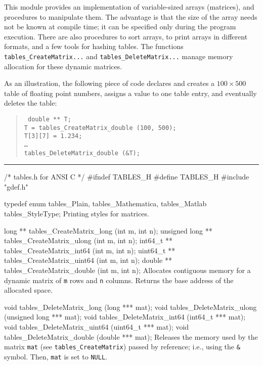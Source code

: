 
This module provides an implementation of variable-sized arrays (matrices),
and procedures to manipulate them.
The advantage is that the size of the array needs not be known
at compile time; it can be specified only during the program execution.
There are also procedures to sort arrays,  to
print  arrays in different formats,
and a few tools for hashing tables.
The functions {\tt tables\_CreateMatrix...} and
{\tt tables\_DeleteMatrix...} manage memory allocation for
these dynamic matrices.

As an illustration, the following piece of code declares and creates
a $100\times 500$ table of floating point numbers, assigns a value
to one table entry, and eventually deletes the table:
  \begin{verse}{\tt
    double ** T;\\
    T = tables\_CreateMatrix\_double (100, 500);\\
    T[3][7] = 1.234;\\
    \dots \\
    tables\_DeleteMatrix\_double (\&T);
  }\end{verse}

\bigskip\hrule

\code\hide
/* tables.h for ANSI C */
#ifndef TABLES_H
#define TABLES_H
\endhide
#include "gdef.h"
\endcode

\code

typedef enum {
   tables_Plain,
   tables_Mathematica,
   tables_Matlab
   } tables_StyleType;
\endcode
  \tab Printing styles for matrices.
  \endtab

\code

long ** tables_CreateMatrix_long  (int m, int n);
unsigned long ** tables_CreateMatrix_ulong (int m, int n);
int64_t ** tables_CreateMatrix_int64  (int m, int n);
uint64_t ** tables_CreateMatrix_uint64 (int m, int n);
double ** tables_CreateMatrix_double  (int m, int n);
\endcode
  \tab Allocates contiguous memory for a dynamic 
  matrix of {\tt m} rows and {\tt n} columns. Returns the base
  address of the allocated space.
  \endtab
\code

void tables_DeleteMatrix_long  (long *** mat);
void tables_DeleteMatrix_ulong (unsigned long *** mat);
void tables_DeleteMatrix_int64  (int64_t *** mat);
void tables_DeleteMatrix_uint64 (uint64_t *** mat);
void tables_DeleteMatrix_double  (double *** mat);
\endcode
  \tab Releases the memory used by the matrix {\tt mat}
  (see {\tt tables\_CreateMatrix}) passed by reference; i.e., using the {\tt \&} symbol. 
  Then, {\tt mat} is set to {\tt NULL}.
  \endtab
\code

